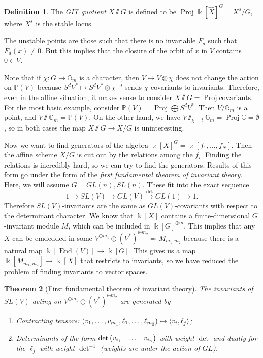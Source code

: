 \documentclass[leqno, openany]{memoir}
\newtheorem{thm}{Theorem}[section]
\theoremstyle{definition}
\newtheorem{defn}[thm]{Definition}
\theoremstyle{remark}
\theoremstyle{plain}
\theoremstyle{definition}
\theoremstyle{remark}
\newcommand{\C}{\mathbb{C}}
\newcommand{\G}{\mathbb{G}}
\renewcommand{\k}{\Bbbk}
\renewcommand{\P}{\mathbb{P}}
\newcommand{\wh}[1]{\widehat{#1}}
\DeclareMathOperator{\End}{End}
\DeclareMathOperator{\Proj}{Proj}
\begin{document}
\begin{defn}
    The \textit{GIT quotient} $X \sslash G$ is defined to be $\Proj {\k[\wh{X}]}^G = X^s/G$, where $X^s$ is the stable locus.
\end{defn}

The unstable points are those such that there is no invariable $F_d$ such that $F_d(x) \neq 0$. But this implies that the closure of the orbit of $x$ in $V$ contains $0 \in V$.

Note that if $\chi \colon G \to \mathbb{G}_m$ is a character, then $V \mapsto V \otimes \chi$ does not change the action on $\P(V)$ because $S^d V^* \mapsto S^d V^* \otimes \chi^{-d}$ sends $\chi$-covariants to invariants. Therefore, even in the affine situation, it makes sense to consider $X \sslash G = \Proj \text{covariants}$. For the most basic example, consider $\P(V) = \Proj \bigoplus S^d V^*$. Then $V/\G_m$ is a point, and $V \sslash \G_m = \P(V)$. On the other hand, we have $V \sslash_{\chi = t} \G_m = \Proj \C = \emptyset$, so in both cases the map $X \sslash G \to X/G$ is uninteresting.

Now we want to find generators of the algebra ${\k[X]}^G = \k[f_1, \ldots, f_N]$. Then the affine scheme $X/G$ is cut out by the relations among the $f_i$. Finding the relations is incredibly hard, so we can try to find the generators. Results of this form go under the form of the \textit{first fundamental theorem of invariant theory}. Here, we will assume $G = GL(n), SL(n)$. These fit into the exact sequence
\[ 1 \to SL(V) \to GL(V) \xrightarrow{\det} GL(1) \to 1. \]
Therefore $SL(V)$-invariants are the same as $GL(V)$-covariants with respect to the determinant character. We know that $\k[X]$ contains a finite-dimensional $G$-invariant module $M$, which can be included in ${\k[G]}^{\oplus m}$. This implies that any $X$ can be emdedded in some $V^{\oplus m_1} \oplus {(V^*)}^{\oplus m_2} \eqqcolon M_{m_1, m_2}$ because there is a natural map $\k[\End(V)] \to \k[G]$. This gives us a map $\k[M_{m_1, m_2}] \to \k[X]$ that restricts to invariants, so we have reduced the problem of finding invariants to vector spaces.

\begin{thm}[First fundamental theorem of invariant theory]
    The invariants of $SL(V)$ acting on $V^{\oplus m_1} \oplus {(V^*)}^{\oplus m_2}$ are generated by 
    \begin{enumerate}
        \item Contracting tensors: $(v_1, \ldots, v_{m_1}, \ell_1, \ldots, \ell_{m_2}) \mapsto \ev{v_i, \ell_j}$;
        \item Determinants of the form $\det \mqty(v_{i_1} & \ldots & v_{i_n})$ with weight $\det$ and dually for the $\ell_{j}$ with weight $\det^{-1}$ (weights are under the action of $GL$).
    \end{enumerate}
\end{thm}
\end{document}
